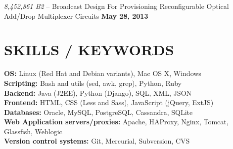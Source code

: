 \documentclass[margin,line]{resume}
\begin{document}
\begin{resume}
    \textsl{8,452,861 B2} -- Broadcast Design For Provisioning Reconfigurable Optical Add/Drop Multiplexer Circuits \hfill \textbf{May 28, 2013}\\

    \vspace{-4mm}

\sectionline

    \section{\mysidestyle \textbf{\large{S}\small{KILLS} / \large{K}\small{EYWORDS}}}

    \textbf{OS:} Linux (Red Hat and Debian variants), Mac OS X, Windows \\
    \textbf{Scripting:} Bash and utils (sed, awk, grep), Python, Ruby\\
    \textbf{Backend:} Java (J2EE), Python (Django), SQL, XML, JSON\\
    \textbf{Frontend:} HTML, CSS (Less and Sass), JavaScript (jQuery, ExtJS)\\
    \textbf{Databases:} Oracle, MySQL, PostgreSQL, Cassandra, SQLite\\
    \textbf{Web Application servers/proxies:} Apache, HAProxy, Nginx, Tomcat, Glassfish, Weblogic\\
    \textbf{Version control systems:} Git, Mercurial, Subversion, CVS\\

\end{resume}
\end{document}
